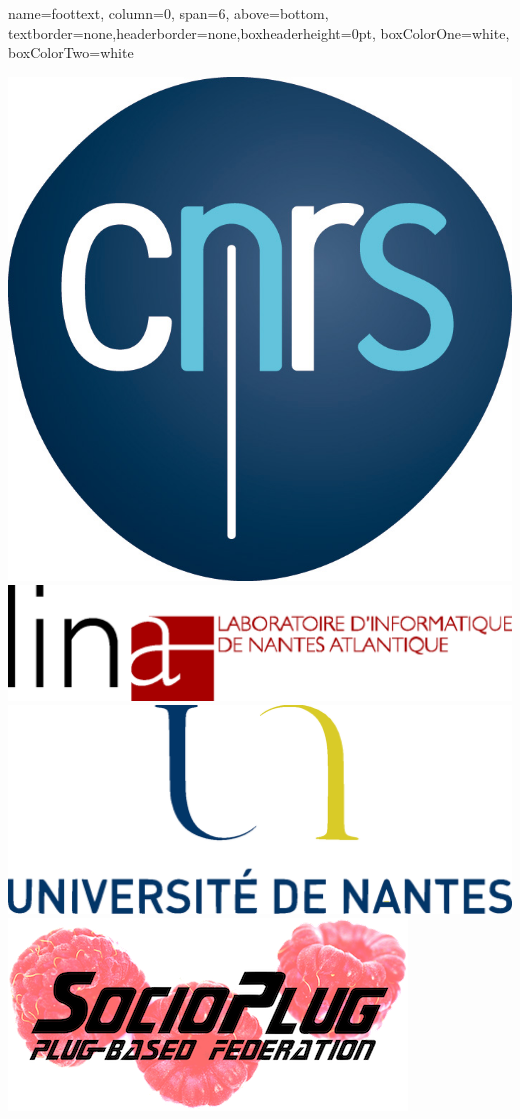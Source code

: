 \documentclass[a1paper, fontscale=0.4, portrait]{baposter}
\begin{document}
\begin{poster}
  \headerbox{}%
  {name=foottext, column=0, span=6, above=bottom,%
    textborder=none,headerborder=none,boxheaderheight=0pt, boxColorOne=white,%
    boxColorTwo=white}{
    \begin{center}
      \includegraphics[scale=0.07]{logos/CNRS.jpg} \hspace{2.75em}
      \includegraphics[scale=0.2]{logos/LINA.eps} \hspace{2.75em}
      \includegraphics[scale=0.2]{logos/UnivNantes.eps} \hspace{2.75em}
      \includegraphics[scale=0.2]{logos/socioplug.png}
    \end{center}
  }


\end{poster}
\end{document}
